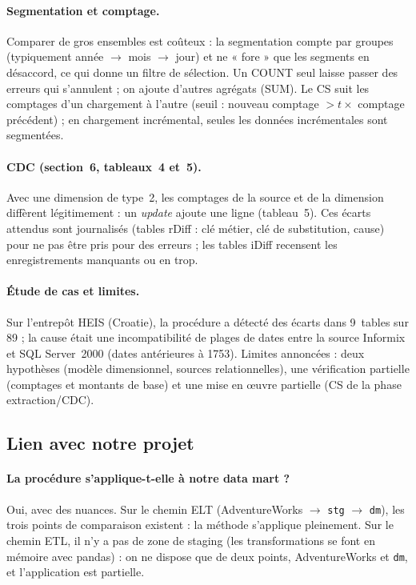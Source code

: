 \documentclass[10pt,a4paper]{article}
\begin{document}
\paragraph{Segmentation et comptage.} Comparer de gros ensembles est coûteux : la segmentation compte par groupes (typiquement année $\rightarrow$ mois $\rightarrow$ jour) et ne « fore » que les segments en désaccord, ce qui donne un filtre de sélection. Un COUNT seul laisse passer des erreurs qui s'annulent ; on ajoute d'autres agrégats (SUM). Le CS suit les comptages d'un chargement à l'autre (seuil : nouveau comptage $>t\times$ comptage précédent) ; en chargement incrémental, seules les données incrémentales sont segmentées.

\paragraph{CDC (section~6, tableaux~4 et~5).} Avec une dimension de type~2, les comptages de la source et de la dimension diffèrent légitimement : un \emph{update} ajoute une ligne (tableau~5). Ces écarts attendus sont journalisés (tables rDiff : clé métier, clé de substitution, cause) pour ne pas être pris pour des erreurs ; les tables iDiff recensent les enregistrements manquants ou en trop.

\paragraph{Étude de cas et limites.} Sur l'entrepôt HEIS (Croatie), la procédure a détecté des écarts dans 9~tables sur 89 ; la cause était une incompatibilité de plages de dates entre la source Informix et SQL Server~2000 (dates antérieures à 1753). Limites annoncées : deux hypothèses (modèle dimensionnel, sources relationnelles), une vérification partielle (comptages et montants de base) et une mise en œuvre partielle (CS de la phase extraction/CDC).

\subsection{Lien avec notre projet}

\paragraph{La procédure s'applique-t-elle à notre data mart ?} Oui, avec des nuances. Sur le chemin ELT (AdventureWorks $\rightarrow$ \texttt{stg} $\rightarrow$ \texttt{dm}), les trois points de comparaison existent : la méthode s'applique pleinement. Sur le chemin ETL, il n'y a pas de zone de staging (les transformations se font en mémoire avec pandas) : on ne dispose que de deux points, AdventureWorks et \texttt{dm}, et l'application est partielle.
\end{document}
